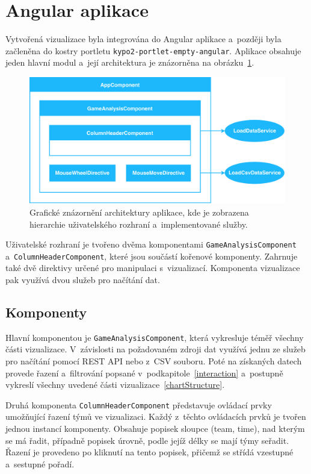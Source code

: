 \documentclass[
  digital, %
  oneside, %
  table,   %
  nolof,     %
  nolot,     %
  nocover
]{fithesis3}
\begin{document}
\section{Angular aplikace}
Vytvořená vizualizace byla integrována do Angular aplikace a~později byla začleněna do kostry portletu \verb|kypo2-portlet-empty-angular|. Aplikace obsahuje jeden hlavní modul a~její architektura je znázorněna na obrázku~\ref{fig:architecture}.
\begin{figure}[H]
  \begin{center}
    \includegraphics[width=12.7cm]{images/architektura-4.pdf}
  \end{center}
  \caption{Grafické znázornění architektury aplikace, kde je zobrazena hierarchie uživatelského rozhraní a~implementované služby.}
  \label{fig:architecture}
\end{figure}
Uživatelské rozhraní je tvořeno dvěma komponentami \verb|GameAna|\-\verb|lysisComponent| a~\verb|ColumnHeaderComponent|, které jsou součástí kořenové komponenty. Zahrnuje také dvě direktivy určené pro manipulaci s~vizualizací. Komponenta vizualizace pak využívá dvou služeb pro načítání dat.
\subsection{Komponenty}
Hlavní komponentou je \verb|GameAnalysisComponent|, která vykresluje téměř všechny části vizualizace. V~závislosti na požadovaném zdroji dat využívá jednu ze služeb pro načítání pomocí REST API nebo z~CSV souboru. Poté na získaných datech provede řazení a~filtrování popsané v~podkapitole~\ref{interaction} a~postupně vykreslí všechny uvedené části vizualizace~\ref{chartStructure}.\par
Druhá komponenta \verb|ColumnHeaderComponent| představuje ovládací prvky umožňující řazení týmů ve vizualizaci. Každý z~těchto ovládacích prvků je tvořen jednou instancí komponenty. Obsahuje popisek sloupce (team, time), nad kterým se má řadit, případně popisek úrovně, podle jejíž délky se mají týmy seřadit. Řazení je provedeno po kliknutí na tento popisek, přičemž se střídá vzestupné a~sestupné pořadí.
\end{document}
